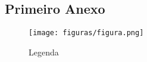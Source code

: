 \begin{anexosenv}

\partanexos

\chapter{Primeiro Anexo}
\label{appendix:anexo_certificado}
\begin{figure}[H]
    \centering
    \texttt{[image: figuras/figura.png]}
    \caption{Legenda}
    \label{fig:Legenda}
\end{figure}

\end{anexosenv}

